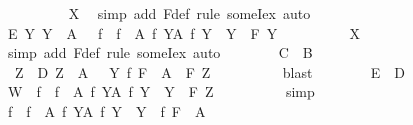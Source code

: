 \begin{isabellebody}
\ \ \ \ \ \ \ \ \isamarkupfalse%
\ X\ \isamarkupfalse%
\ {\isacharparenleft}{\kern0pt}simp\ add{\isacharcolon}{\kern0pt}\ F{\isacharunderscore}{\kern0pt}def{\isacharcomma}{\kern0pt}\ rule\ someI{}{\isacharunderscore}{\kern0pt}ex{\isacharcomma}{\kern0pt}\ auto{\isacharparenright}{\kern0pt}\isanewline
\ \ \ \ \ \ \isamarkupfalse%
\ E{\isacharcolon}{\kern0pt}\ {\isachardoublequoteopen}{\isasymAnd}Y{\isachardot}{\kern0pt}\ Y\ {\isasymin}\ A\ {\isasymLongrightarrow}\ {\isasymnot}\ {\isasymSqinter}{\isacharparenleft}{\kern0pt}f\ {\isacharbackquote}{\kern0pt}\ {\isacharbraceleft}{\kern0pt}f\ {\isacharbackquote}{\kern0pt}\ A\ {\isacharbar}{\kern0pt}f{\isachardot}{\kern0pt}\ {\isasymforall}Y{\isasymin}A{\isachardot}{\kern0pt}\ f\ Y\ {\isasymin}\ Y{\isacharbraceright}{\kern0pt}{\isacharparenright}{\kern0pt}\ {\isasymle}\ F\ Y{\isachardoublequoteclose}\isanewline
\ \ \ \ \ \ \ \ \isamarkupfalse%
\ X\ \isamarkupfalse%
\ {\isacharparenleft}{\kern0pt}simp\ add{\isacharcolon}{\kern0pt}\ F{\isacharunderscore}{\kern0pt}def{\isacharcomma}{\kern0pt}\ rule\ someI{}{\isacharunderscore}{\kern0pt}ex{\isacharcomma}{\kern0pt}\ auto{\isacharparenright}{\kern0pt}\isanewline
\ \ \ \ \ \ \isamarkupfalse%
\ C\ \ B\ \isamarkupfalse%
\ \ Z\ \ D{\isacharcolon}{\kern0pt}\ {\isachardoublequoteopen}Z\ {\isasymin}\ A\ {\isachardoublequoteclose}\ \ Y{\isacharcolon}{\kern0pt}\ {\isachardoublequoteopen}f\ {\isacharparenleft}{\kern0pt}F\ {\isacharbackquote}{\kern0pt}\ A{\isacharparenright}{\kern0pt}\ {\isacharequal}{\kern0pt}\ F\ Z{\isachardoublequoteclose}\isanewline
\ \ \ \ \ \ \ \ \isamarkupfalse%
\ blast\isanewline
\ \ \ \ \ \ \isamarkupfalse%
\ E\ \ D\ \isamarkupfalse%
\ W{\isacharcolon}{\kern0pt}\ {\isachardoublequoteopen}{\isasymnot}\ {\isasymSqinter}{\isacharparenleft}{\kern0pt}f\ {\isacharbackquote}{\kern0pt}\ {\isacharbraceleft}{\kern0pt}f\ {\isacharbackquote}{\kern0pt}\ A\ {\isacharbar}{\kern0pt}f{\isachardot}{\kern0pt}\ {\isasymforall}Y{\isasymin}A{\isachardot}{\kern0pt}\ f\ Y\ {\isasymin}\ Y{\isacharbraceright}{\kern0pt}{\isacharparenright}{\kern0pt}\ {\isasymle}\ F\ Z{\isachardoublequoteclose}\isanewline
\ \ \ \ \ \ \ \ \isamarkupfalse%
\ simp\isanewline
\ \ \ \ \ \ \isamarkupfalse%
\ {\isachardoublequoteopen}{\isasymSqinter}{\isacharparenleft}{\kern0pt}f\ {\isacharbackquote}{\kern0pt}\ {\isacharbraceleft}{\kern0pt}f\ {\isacharbackquote}{\kern0pt}\ A\ {\isacharbar}{\kern0pt}f{\isachardot}{\kern0pt}\ {\isasymforall}Y{\isasymin}A{\isachardot}{\kern0pt}\ f\ Y\ {\isasymin}\ Y{\isacharbraceright}{\kern0pt}{\isacharparenright}{\kern0pt}\ {\isasymle}\ f\ {\isacharparenleft}{\kern0pt}F\ {\isacharbackquote}{\kern0pt}\ A{\isacharparenright}{\kern0pt}{\isachardoublequoteclose}\isanewline

\end{isabellebody}
